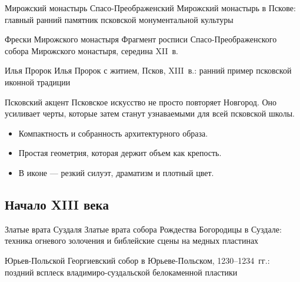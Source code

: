 \begin{frame}{Мирожский монастырь}
    {Спасо-Преображенский Мирожский монастырь в Пскове:
     главный ранний памятник псковской монументальной культуры}
\end{frame}

\begin{frame}{Фрески Мирожского монастыря}
    {Фрагмент росписи Спасо-Преображенского собора
     Мирожского монастыря, середина XII~в.}
\end{frame}

\begin{frame}{Илья Пророк}
    {Илья Пророк с житием, Псков, XIII~в.:
     ранний пример псковской иконной традиции}
\end{frame}

\begin{frame}{Псковский акцент}
  Псковское искусство не просто повторяет Новгород.
  Оно усиливает черты, которые затем станут узнаваемыми
  для всей псковской школы.

  \begin{itemize}
    \item Компактность и собранность архитектурного образа.
    \item Простая геометрия, которая держит объем как крепость.
    \item В иконе --- резкий силуэт, драматизм и плотный цвет.
  \end{itemize}
\end{frame}

\subsection{Начало XIII века}

\begin{frame}{Златые врата Суздаля}
    {Златые врата собора Рождества Богородицы в Суздале:
     техника огневого золочения и библейские сцены
     на медных пластинах}
\end{frame}

\begin{frame}{Юрьев-Польской}
    {Георгиевский собор в Юрьеве-Польском, 1230--1234~гг.:
     поздний всплеск владимиро-суздальской белокаменной пластики}
\end{frame}

